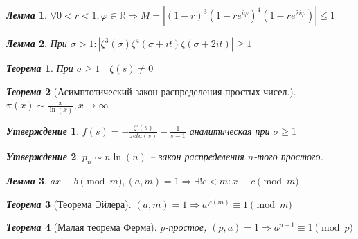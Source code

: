 \documentclass[a4paper,12pt]{article}
\newtheorem{teo2}{\textit{Теорема}}
\newtheorem{utv2}{\textit{Утверждение}}
\newtheorem{lem2}{\textit{Лемма}}
\newcommand{\ee}{\equiv}
\newcommand{\FI}{\varphi}
\newcommand{\q}{\quad}
\newcommand{\Ra}{\Rightarrow}
\newcommand{\bb}[1]{\mathbb{#1}}
\begin{document}
\begin{formbox}{}
\begin{lem2} $\forall 0 < r < 1, \varphi\in \bb{R} \Ra M = \left| (1-r)^3(1-re^{i\varphi})^4 (1 - re^{2i\varphi}) \right| \le 1 $
\end{lem2}
\end{formbox}
\begin{formbox}{}
\begin{lem2} При $\sigma > 1: |\zeta^3(\sigma)\zeta^4(\sigma+it)\zeta(\sigma+2it)| \ge 1$
\end{lem2}
\end{formbox}
\begin{formbox}{}
\begin{teo2} При $\sigma \ge 1 \q \zeta(s) \not= 0$
\end{teo2}
\end{formbox}
\begin{formbox}{}
\begin{teo2}[Асимптотический закон распределения простых чисел.]\q\\
$\pi(x)\sim \frac{x}{\ln(x)}, x\to\infty$
\end{teo2}
\end{formbox}
\begin{formbox}{}
\begin{utv2} $f(s) = -\frac{\zeta'(s)}{zeta(s)} - \frac{1}{s-1} $ аналитическая при $\sigma \ge 1$
\end{utv2}
\end{formbox}
\begin{formbox}{}
\begin{utv2} $p_n \sim n\ln(n)$ -- закон распределения $n$-того простого.
\end{utv2}
\end{formbox}
\begin{formbox}{}
\begin{lem2} $ax\ee b\pmod{m}, (a,m) = 1\Ra \exists!c<m:x\ee c\pmod{m}$
\end{lem2}
\end{formbox}
\begin{formbox}{}
\begin{teo2}[Теорема Эйлера] $(a,m) = 1\Ra a^{\FI(m)} \ee 1\pmod{m}$
\end{teo2}
\end{formbox}
\begin{formbox}{}
\begin{teo2}[Малая теорема Ферма] $p$-простое, $(p,a) = 1\Ra a^{p-1} \ee 1\pmod{p}$
\end{teo2}
\end{formbox}
\end{document}

